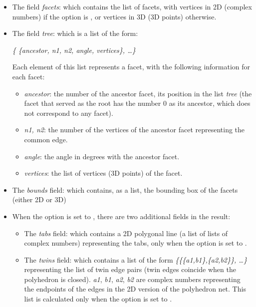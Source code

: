 \begin{itemize}
    \item The field \emph{facets}: which contains the list of facets, with vertices in 2D (complex numbers) if the  option is \true, or vertices in 3D (3D points) otherwise.

    \item The field \emph{tree}: which is a list of the form: \par
\hfil\emph{\{ \{ancestor, n1, n2, angle, vertices\}, \ldots\} }\hfil\par
    Each element of this list represents a facet, with the following information for each facet:
    \begin{itemize}
        \item \emph{ancestor}: the number of the ancestor facet, its position in the list \emph{tree} (the facet that served as the root has the number $0$ as its ancestor, which does not correspond to any facet).
        \item \emph{n1, n2}: the number of the vertices of the ancestor facet representing the common edge.

        \item  \emph{angle}: the angle in degrees with the ancestor facet.

        \item  \emph{vertices}: the list of vertices (3D points) of the facet.
    \end{itemize}

    \item The \emph{bounds} field: which contains, as a list, the bounding box of the facets (either 2D or 3D)
    
    \item When the  option is set to \true, there are two additional fields in the result:
    \begin{itemize}
        \item The \emph{tabs} field: which contains a 2D polygonal line (a list of lists of complex numbers) representing the tabs, only when the  option is set to \true.

        \item The \emph{twins} field: which contains a list of the form \emph{\{\{\{a1,b1\},\{a2,b2\}\}, \ldots\}} representing the list of twin edge pairs (twin edges coincide when the polyhedron is closed). \emph{a1}, \emph{b1}, \emph{a2}, \emph{b2} are complex numbers representing the endpoints of the edges in the 2D version of the polyhedron net. This list is calculated only when the  option is set to \true. 
    \end{itemize} 
\end{itemize}

